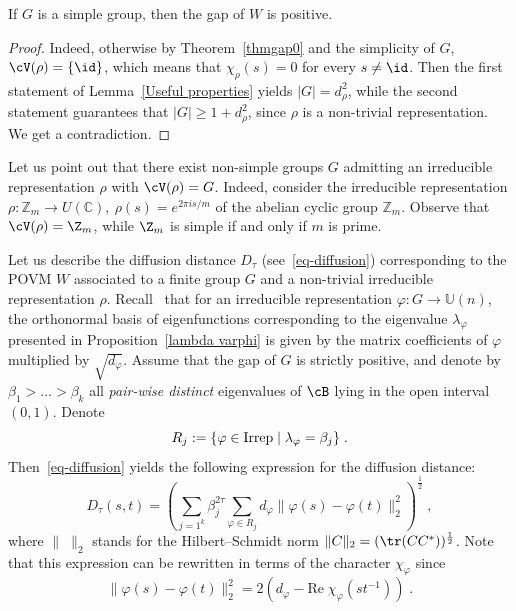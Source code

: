 \goodbreak

\begin{coro}\label{cor-simplegr}
If $G$ is a simple group, then the gap of $W$ is positive.
\end{coro}

\begin{proof}
Indeed, otherwise by Theorem~\ref{thmgap0} and the simplicity of $G$,
$\cV(\rho) = \{\id\}$, which means that $\chi_\rho(s) =0$ for every $s \neq \id$. Then the first statement of Lemma~\ref{Useful properties} yields $|G| = d_\rho^2$, while the second statement guarantees that $|G| \geq 1+ d_\rho^2$, since $\rho$ is a non-trivial representation. We get a contradiction.
\end{proof}



Let us point out that there exist non-simple groups $G$ admitting an irreducible representation $\rho$ with $\cV(\rho)=G$. Indeed, consider the irreducible representation $\rho:\mathbb{Z}_m\to U(\mathbb{C}),\ \rho(s)=e^{2\pi i s/m}$ of the abelian cyclic group $\mathbb{Z}_m$. Observe that $\cV(\rho) = \Z_m$, while $\Z_m$ is simple if and only if $m$ is prime.


Let us describe the diffusion distance $D_\tau$ (see~\eqref{eq-diffusion}) corresponding to the POVM $W$ associated to a finite group $G$ and a non-trivial irreducible representation $\rho$. Recall~\cite{Diaconis} that for an irreducible representation $\varphi: G \to \mathbb{U}(n)$, the orthonormal basis of eigenfunctions corresponding to the eigenvalue $\lambda_\varphi$ presented in Proposition~\ref{lambda varphi} is given by the matrix coefficients of $\varphi$ multiplied by $\sqrt{d_\varphi}$. Assume that the gap of $G$ is strictly positive, and denote by $\beta_1 > \dots > \beta_k$ all \emph{pair-wise distinct} eigenvalues of $\cB$ lying in the open interval $(0,1)$. Denote
\[
R_j := \{\varphi \in \textup{Irrep}\mid \lambda_{\varphi} = \beta_j\}\;.
\]
Then~\eqref{eq-diffusion} yields the following expression for the diffusion distance:
\begin{equation}\label{eq-diffusion-1}
D_\tau(s,t) = \left (\sum_{j=1^k} \beta_j^{2\tau} \sum_{\varphi \in R_j} d_\varphi \|\varphi(s)-\varphi(t)\|_2^2 \right)^{\frac{1}{2}} \;,
\end{equation}
where $\|\;\|_2$ stands for the Hilbert--Schmidt norm $\|C\|_2= (\tr (CC^*))^{\frac{1}{2}}$. Note that this expression can be rewritten in terms of the character $\chi_\varphi$ since
\[
\|\varphi(s)-\varphi(t)\|_2^2 = 2\left(d_\varphi- \text{Re}\;\chi_\varphi\left(st^{-1}\right)\right)\;.
\]

